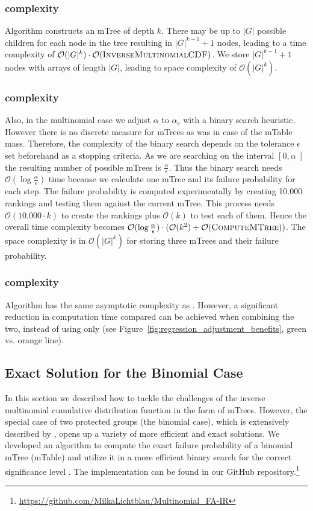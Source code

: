 \subsubsection{\algoComputeMTree complexity}\label{subsubsec:mtree-complexity}
Algorithm \algoComputeMTree constructs an mTree of depth $k$.
%
There may be up to $|G|$ possible children for each node in the tree resulting in $|G|^{k-1} +1$ nodes, leading to a time complexity of $\mathcal{O}(|G|^{k}) \cdot \mathcal{O}(\text{{\sc InverseMultinomialCDF}})$.
%
We store $|G|^{k-1} +1$ nodes with arrays of length $|G|$, leading to space complexity of $\mathcal{O}(|G|^{k})$.
%
\subsubsection{\algoMultBinary complexity}\label{subsubsec:multBinary-complexity}
Also, in the multinomial case we adjust $\alpha$ to $\alpha_c$ with a binary search heuristic.
%
However there is no discrete measure for mTrees as was in case of the mTable mass.
%
Therefore, the complexity of the binary search depends on the tolerance $\epsilon$ set beforehand as a stopping criteria.
%
As we are searching on the interval $\left[0,\alpha\right[$ the resulting number of possible mTrees is $\frac{\alpha}{\epsilon}$.
%
Thus the binary search needs $\mathcal{O}(\log{}\frac{\alpha}{\epsilon})$ time because we calculate one mTree and its failure probability for each step.
%
The failure probability is computed experimentally by creating 10.000 rankings and testing them against the current mTree.
%
This process needs $\mathcal{O}(10.000 \cdot k)$ to create the rankings plus $\mathcal{O}(k)$ to test each of them.
%
Hence the overall time complexity becomes $\mathcal{O}(\log{}\frac{\alpha}{\epsilon}) \cdot (\mathcal{O}(k^2) + \mathcal{O}(\text{{\sc ComputeMTree}}))$.
%
The space complexity is in $\mathcal{O}(|G|^k)$ for storing three mTrees and their failure probability.
%
\subsubsection{\algoReg complexity}\label{subsubsec:regression-complexity}
Algorithm \algoReg has the same asymptotic complexity as \algoMultBinary.
%
However, a significant reduction in computation time compared can be achieved when combining the two, instead of using \algoMultBinary only (see Figure~\ref{fig:regression_adjustment_benefits}, green vs. orange line).
%
\subsection{Exact Solution for the Binomial Case}
In this section we described how to tackle the challenges of the inverse multinomial cumulative distribution function in the form of mTrees. However, the special case of two protected groups (the binomial case), which is extensively described by \citet{zehlike2017fair}, opens up a variety of more efficient and exact solutions. We developed an algorithm to compute the exact failure probability of a binomial mTree (mTable) and utilize it in a more efficient binary search for the correct significance level \cite{zehlike2020note}. The implementation can be found in our GitHub repository.\footnote{\url{https://github.com/MilkaLichtblau/Multinomial_FA-IR}}
